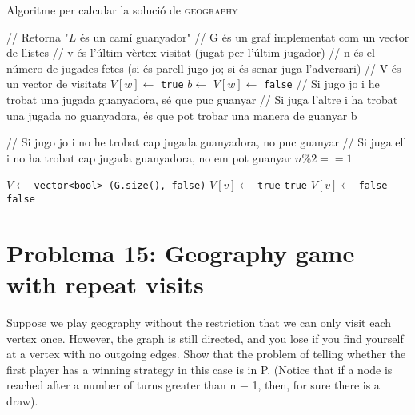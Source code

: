 \documentclass[a4paper]{article}
\begin{document}
\begin{algorithm}[H]
	\caption{Algoritme per calcular la solució de \textsc{geography}}
	\begin{algorithmic}[1]
		\State // Retorna "$L$ és un camí guanyador"
		\State // G és un graf implementat com un vector de llistes
		\State // v és l'últim vèrtex visitat (jugat per l'últim jugador)
		\State // n és el número de jugades fetes (si és parell jugo jo; si és senar juga l'adversari)
		\State // V és un vector de visitats
					\State $V[w] \gets$ \texttt{true}
					\State $b \gets$ 
					\State $V[w] \gets$ \texttt{false}
					\State
					\State // Si jugo jo i he trobat una jugada guanyadora, sé que puc guanyar
					\State // Si juga l'altre i ha trobat una jugada no guanyadora, és que pot trobar una manera de guanyar
						\State \Return b
					\EndIf
				\EndIf
			\EndFor
			
			\State // Si jugo jo i no he trobat cap jugada guanyadora, no puc guanyar
			\State // Si juga ell i no ha trobat cap jugada guanyadora, no em pot guanyar
			\State \Return $n\%2 == 1$
		\EndFunction
	\end{algorithmic}
\end{algorithm}

\begin{algorithm}[!h]
	\begin{algorithmic}[1]
			\State $V \gets$  \texttt{vector<bool> (G.size(), false)}
				\State $V[v] \gets$ \texttt{true}
					\State \Return \texttt{true}
				\EndIf
				\State $V[v] \gets$ \texttt{false}
			\EndFor
			\State \Return \texttt{false}
		\EndFunction
	\end{algorithmic}
\end{algorithm}

\section{Problema 15: Geography game with repeat visits}
Suppose we play geography without the restriction that we can only visit each vertex once. However, the graph is still directed, and you lose if you find yourself at a vertex with no outgoing edges. Show that the problem of telling whether the first player has a winning strategy in this case is in P. (Notice that if a node is reached after a number of turns greater than n − 1, then, for sure there is a draw).
\end{document}
